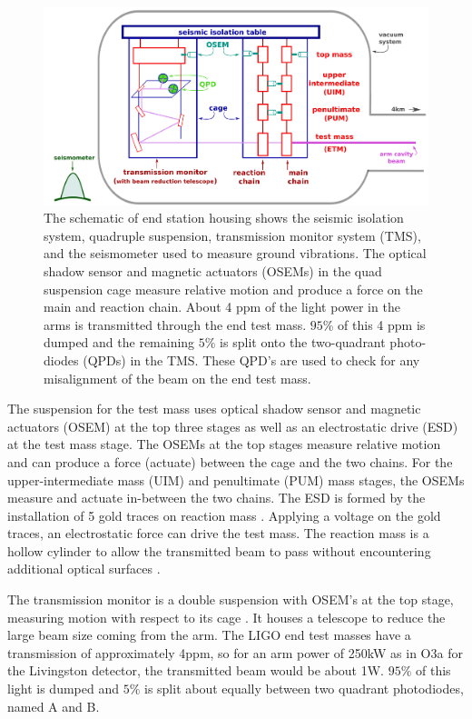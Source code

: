 \documentclass[12pt]{iopart}
\begin{document}
\begin{figure}
    \centering
    \includegraphics[width=\textwidth]{EndStationDiagram3.png}
    \caption{The schematic of end station housing shows the seismic isolation system, quadruple suspension, transmission monitor system (TMS), and the seismometer used to measure ground vibrations. The optical shadow sensor and magnetic actuators (OSEMs) in the quad suspension cage measure relative motion and produce a force on the main and reaction chain. About 4 ppm of the light power in the arms is transmitted through the end test mass. $95$\% of this 4 ppm is dumped and the remaining $5$\% is split onto the two-quadrant photo-diodes (QPDs) in the TMS. These QPD's are used to check for any misalignment of the beam on the end test mass. }
    \label{fig:end_station}
\end{figure}
The suspension for the test mass uses optical shadow sensor and magnetic actuators (OSEM)  at the top three stages as well as an electrostatic drive (ESD) at the test mass stage. The OSEMs at the top stages measure relative motion and can produce a force (actuate) between the cage and the two chains. For the upper-intermediate mass (UIM) and penultimate (PUM) mass stages, the OSEMs measure and actuate in-between the two chains. The ESD is formed by the installation of 5 gold traces on reaction mass \cite{esd_schematic}. Applying a voltage on the gold traces, an electrostatic force can drive the test mass.  The reaction mass is a hollow cylinder to allow the transmitted beam to pass without encountering additional optical surfaces \cite{aerm_schematic}.

The transmission monitor is a double suspension with OSEM's at the top stage, measuring motion with respect to its cage \cite{Barsotti_2010}. It houses a telescope to reduce the large beam size coming from the arm. The LIGO end test masses have a transmission of approximately 4ppm, so for an arm power of 250kW as in O3a for the Livingston detector, the transmitted beam would be about 1W. $95\%$ of this light is dumped and $5\%$ is split about equally between two quadrant photodiodes, named A and B. 
\end{document}
